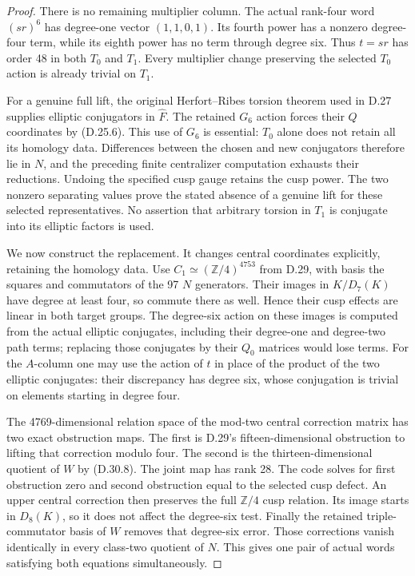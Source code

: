 \begin{proof}
There is no remaining multiplier column. The actual
rank-four word $(sr)^6$ has degree-one vector
$(1,1,0,1)$. Its fourth power has a nonzero degree-four
term, while its eighth power has no term through
degree six. Thus $t=sr$ has order 48 in both $T_0$
and $T_1$. Every multiplier change preserving the
selected $T_0$ action is already trivial on $T_1$.

For a genuine full lift, the original Herfort--Ribes
torsion theorem used in D.27 supplies elliptic
conjugators in $\widehat F$. The retained $G_6$
action forces their $Q$ coordinates by (D.25.6).
This use of $G_6$ is essential: $T_0$ alone does not
retain all its homology data. Differences between
the chosen and new conjugators therefore lie in $N$,
and the preceding finite centralizer computation
exhausts their reductions. Undoing the specified cusp
gauge retains the cusp power. The two nonzero
separating values prove the stated absence of a
genuine lift for these selected representatives.
No assertion that arbitrary torsion in $T_1$ is
conjugate into its elliptic factors is used.

We now construct the replacement. It changes central
coordinates explicitly, retaining the homology data.
Use $C_1\simeq(\mathbb Z/4)^{4753}$ from D.29, with
basis the squares and commutators of the 97 $N$
generators. Their images in $K/D_7(K)$ have degree
at least four, so commute there as well. Hence their
cusp effects are linear in both target groups.
The degree-six action on these images is computed
from the actual elliptic conjugates, including their
degree-one and degree-two path terms; replacing those
conjugates by their $Q_0$ matrices would lose terms.
For the $A$-column one may use the action of $t$ in
place of the product of the two elliptic conjugates:
their discrepancy has degree six, whose conjugation
is trivial on elements starting in degree four.

The 4769-dimensional relation space of the mod-two
central correction matrix has two exact obstruction
maps. The first is D.29's fifteen-dimensional
obstruction to lifting that correction modulo four.
The second is the thirteen-dimensional quotient of
$W$ by (D.30.8). The joint map has rank 28. The code
solves for first obstruction zero and second
obstruction equal to the selected cusp defect.
An upper central correction then preserves the full
$\mathbb Z/4$ cusp relation. Its image starts in
$D_8(K)$, so it does not affect the degree-six test.
Finally the retained triple-commutator basis of $W$
removes that degree-six error. Those corrections
vanish identically in every class-two quotient of $N$.
This gives one pair of actual words satisfying both
equations simultaneously.


\end{proof}
